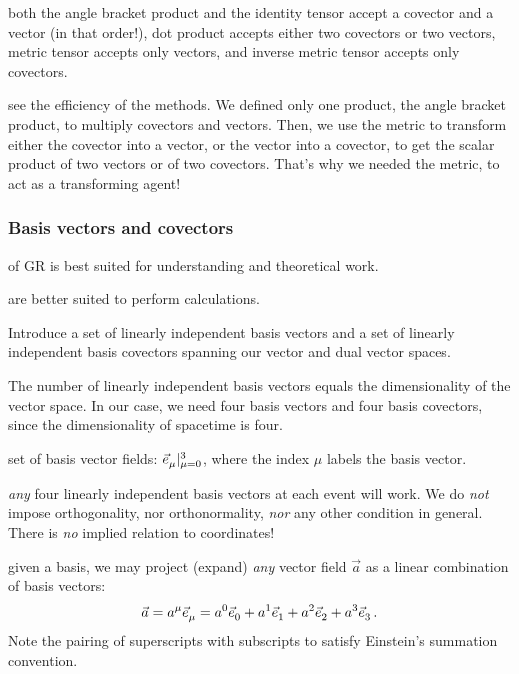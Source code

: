  both the angle bracket product and the identity tensor accept a covector and a vector (in that order!), dot product accepts either two covectors or two vectors, metric tensor accepts only vectors, and inverse metric tensor accepts only covectors.

 see the efficiency of the methods. We defined only one product, the angle bracket product, to multiply covectors and vectors. Then, we use the metric to transform either the covector into a vector, or the vector into a covector, to get the scalar product of two vectors or of two covectors. That's why we needed the metric, to act as a transforming agent!


\subsubsection{Basis vectors and covectors}
%
 of GR is best suited for understanding and theoretical work.

 are better suited to perform calculations.

 Introduce a set of linearly independent basis vectors and a set of linearly independent basis covectors spanning our vector and dual vector spaces.

 The number of linearly independent basis vectors equals the dimensionality of the vector space. In our case, we need four basis vectors and four basis covectors, since the dimensionality of spacetime is four.

 set of basis vector fields: $\bset{\tbvec\mu}{\mu = 0}{3}$, where the index $\mu$ labels the basis vector.

 \emph{any} four linearly independent basis vectors at each event will work. We do \emph{not} impose orthogonality, nor orthonormality, \emph{nor} any other condition in general. There is \emph{no} implied relation to coordinates!

 given a basis, we may project (expand) \emph{any} vector field $\vec a$ as a linear combination of basis vectors:
%
\begin{equation}\label{eq:vectorprojectiononbasisvectors}
  \vec a = \tvec a\mu\tbvec\mu
         = \tvec a0\tbvec 0 + \tvec a1\tbvec 1 + \tvec a2\tbvec 2 + \tvec a3\tbvec 3\,.
\end{equation}
%
Note the pairing of superscripts with subscripts to satisfy Einstein's summation convention.

